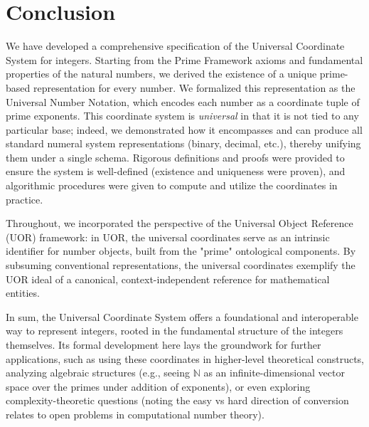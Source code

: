\documentclass[11pt]{article}
\begin{document}
\section*{Conclusion}

We have developed a comprehensive specification of the Universal Coordinate System for integers. Starting from the Prime Framework axioms and fundamental properties of the natural numbers, we derived the existence of a unique prime-based representation for every number. We formalized this representation as the Universal Number Notation, which encodes each number as a coordinate tuple of prime exponents. This coordinate system is \emph{universal} in that it is not tied to any particular base; indeed, we demonstrated how it encompasses and can produce all standard numeral system representations (binary, decimal, etc.), thereby unifying them under a single schema. Rigorous definitions and proofs were provided to ensure the system is well-defined (existence and uniqueness were proven), and algorithmic procedures were given to compute and utilize the coordinates in practice. 

Throughout, we incorporated the perspective of the Universal Object Reference (UOR) framework: in UOR, the universal coordinates serve as an intrinsic identifier for number objects, built from the "prime" ontological components. By subsuming conventional representations, the universal coordinates exemplify the UOR ideal of a canonical, context-independent reference for mathematical entities. 

In sum, the Universal Coordinate System offers a foundational and interoperable way to represent integers, rooted in the fundamental structure of the integers themselves. Its formal development here lays the groundwork for further applications, such as using these coordinates in higher-level theoretical constructs, analyzing algebraic structures (e.g., seeing $\mathbb{N}$ as an infinite-dimensional vector space over the primes under addition of exponents), or even exploring complexity-theoretic questions (noting the easy vs hard direction of conversion relates to open problems in computational number theory).
\end{document}
